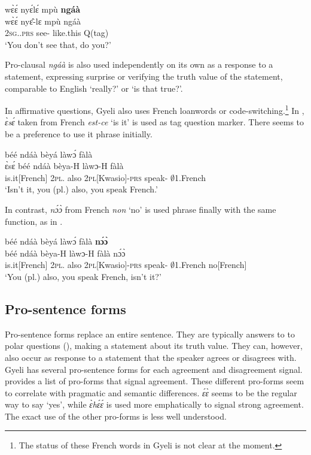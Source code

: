 \ea \label{Qtag3}
  \glll wɛ̀ɛ́ nyɛ́lɛ́ mpù {\bfseries ngáà} \\
       wɛ̀ɛ́ nyɛ̂-lɛ mpù ngáà \\
        2\textsc{sg}.{\NEG}.\textsc{prs} see-{\NEG} like.this Q(tag) \\
    \trans `You don't see that, do you?'
\z


Pro-clausal {\itshape ngáà} is also used independently on its own as a response to a statement, expressing surprise or verifying the truth value of the statement, comparable to English  `really?' or `is that true?'.

In affirmative questions, Gyeli also uses French loanwords or code-switching.\footnote{The status of these French words in Gyeli is not clear at the moment.} In , {\itshape ɛ̀sɛ́} taken from French {\itshape est-ce} `is it' is used as tag question marker. There seems to be a preference to use it phrase initially.

\ea \label{Qtag4}
   béé ndáà bèyá làwɔ́ fàlà \\
       ɛ̀sɛ́ béé ndáà bèya-H làwɔ-H fàlà \\
        is.it[French] 2\textsc{pl}.{\SBJ} also 2\textsc{pl}[Kwasio]-\textsc{prs} speak-{\R} $\emptyset$1.French  \\
    \trans `Isn't it, you (pl.) also, you speak French.'
\z

In contrast, {\itshape nɔ́ɔ̀} from French {\itshape non} `no' is used phrase finally with the same function, as in .

\ea \label{Qtag5}
  \glll  béé ndáà bèyá làwɔ́ fàlà {\bfseries nɔ́ɔ̀}\\
       béé ndáà bèya-H làwɔ-H fàlà nɔ́ɔ̀\\
        is.it[French] 2\textsc{pl}.{\SBJ} also 2\textsc{pl}[Kwasio]-\textsc{prs} speak-{\R} $\emptyset$1.French no[French]\\
    \trans `You (pl.) also, you speak French, isn't it?'
\z




\subsection{Pro-sentence forms}
\label{sec:ProSent}

Pro-sentence forms replace an entire sentence. They are typically answers to to polar questions (), making a statement about its truth value. They can, however, also occur as response to a statement that the speaker agrees or disagrees with. Gyeli has several pro-sentence forms for each agreement and disagreement signal.  provides a list of pro-forms that signal agreement. These different pro-forms seem to correlate with pragmatic and semantic differences. {\itshape ɛ́ɛ̀} seems to be the regular way to say `yes', while {\itshape ɛ̀hɛ́ɛ́} is used more emphatically to signal strong agreement. The exact use of the other pro-forms is less well understood.

